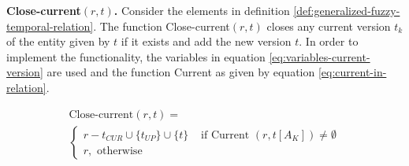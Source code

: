 % 
% 

\begin{definition}
\label{def:pvp-close-current-version}
\textbf{Close-current$\left(r, t \right)$.}
Consider the elements in definition \ref{def:generalized-fuzzy-temporal-relation}. The function Close-current$\left(r, t \right)$ closes any current version $t_k$ of the entity given by $t$ if it exists and add the new version $t$. In order to implement the functionality, the variables in equation \eqref{eq:variables-current-version} are used and the function Current as given by equation \eqref{eq:current-in-relation}.

\begin{eqnarray}
\label{eq:pvp-close-current}
\text{Close-current} \left(r, t \right) =\\
\begin{cases}
\nonumber
r - t_{CUR} \cup \lbrace t_{UP}\rbrace \cup \lbrace t \rbrace
& \mbox{ if } \mbox{Current } \left(r, t[A_K] \right) \neq \emptyset \\
\nonumber r , \text{ otherwise}
\end{cases}
\end{eqnarray}
\end{definition}





